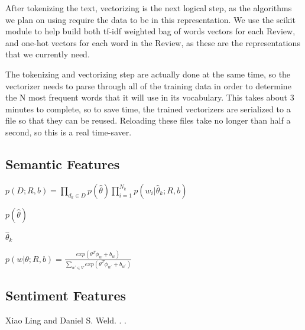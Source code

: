 \documentclass[11pt,letterpaper]{article}
\begin{document}
After tokenizing the text, vectorizing is the next logical step, as the algorithms we plan on using require the data to be in this representation. We use the scikit module to help build both tf-idf weighted bag of words vectors for each Review, and one-hot vectors for each word in the Review, as these are the representations that we currently need.

The tokenizing and vectorizing step are actually done at the same time, so the vectorizer needs to parse through all of the training data in order to determine the N most frequent words that it will use in its vocabulary. This takes about 3 minutes to complete, so to save time, the trained vectorizers are serialized to a file so that they can be reused. Reloading these files take no longer than half a second, so this is a real time-saver.


\subsection{Semantic Features}

$p(D;R,b) = \prod_{d_{k}\in D}^{} p(\hat{\theta}) \prod_{i=1}^{N_{k}} p(w_{i}|\hat{\theta}_{k};R,b)$ 

$p(\hat{\theta})$

$\hat{\theta}_{k}$

$p(w|\theta;R,b) = \frac{exp(\theta^{T}\phi_{w}+b_{w})}{\sum_{w^{'}\in V} exp(\theta^{T}\phi_{w^{'}}+b_{w^{'}})}$

\subsection{Sentiment Features}

\begin{thebibliography}{}

Xiao Ling and Daniel S. Weld.
.
.




\end{thebibliography}
\end{document}
